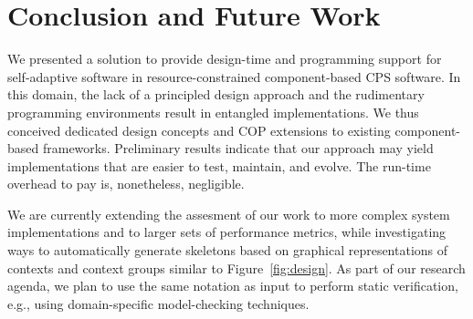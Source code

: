 \section{Conclusion and Future Work}
\label{sec:ending}

We presented a solution to provide design-time and programming support
for self-adaptive software in re\-sour\-ce-constrained component-based
CPS software. In this domain, the lack of a principled design approach
and the rudimentary programming environments result in entangled
implementations. We thus conceived dedicated design concepts and COP
extensions to existing component-based frameworks. Preliminary results
indicate that our approach may yield implementations that are easier
to test, maintain, and evolve. The run-time overhead to pay is,
nonetheless, negligible.



We are currently extending the assesment of our work to more complex
system implementations and to larger sets of performance metrics, while
investigating ways to automatically generate \conesc skeletons based
on graphical representations of contexts and context groups similar to
Figure~\ref{fig:design}.  As part of our research agenda, we plan to
use the same notation as input to perform static verification, e.g.,
using domain-specific model-checking techniques.

